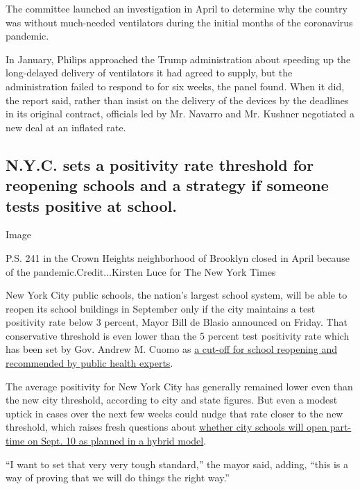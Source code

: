 The committee launched an investigation in April to determine why the
country was without much-needed ventilators during the initial months of
the coronavirus pandemic.

In January, Philips approached the Trump administration about speeding
up the long-delayed delivery of ventilators it had agreed to supply, but
the administration failed to respond to for six weeks, the panel found.
When it did, the report said, rather than insist on the delivery of the
devices by the deadlines in its original contract, officials led by Mr.
Navarro and Mr. Kushner negotiated a new deal at an inflated rate.

\hypertarget{nyc-sets-a-positivity-rate-threshold-for-reopening-schools-and-a-strategy-if-someone-tests-positive-at-school-1}{%
\subsection{N.Y.C. sets a positivity rate threshold for reopening
schools and a strategy if someone tests positive at
school.}\label{nyc-sets-a-positivity-rate-threshold-for-reopening-schools-and-a-strategy-if-someone-tests-positive-at-school-1}}

Image

P.S. 241 in the Crown Heights neighborhood of Brooklyn closed in April
because of the pandemic.Credit...Kirsten Luce for The New York Times

New York City public schools, the nation's largest school system, will
be able to reopen its school buildings in September only if the city
maintains a test positivity rate below 3 percent, Mayor Bill de Blasio
announced on Friday. That conservative threshold is even lower than the
5 percent test positivity rate which has been set by Gov. Andrew M.
Cuomo as
\href{https://www.nytimes3xbfgragh.onion/2020/07/14/us/coronavirus-schools-fall.html}{a
cut-off for school reopening and recommended by public health experts}.

The average positivity for New York City has generally remained lower
even than the new city threshold, according to city and state figures.
But even a modest uptick in cases over the next few weeks could nudge
that rate closer to the new threshold, which raises fresh questions
about
\href{https://www.nytimes3xbfgragh.onion/2020/07/08/nyregion/nyc-schools-reopening-plan.html}{whether
city schools will open part-time on Sept. 10 as planned in a hybrid
model}.

``I want to set that very very tough standard,'' the mayor said, adding,
``this is a way of proving that we will do things the right way.''

